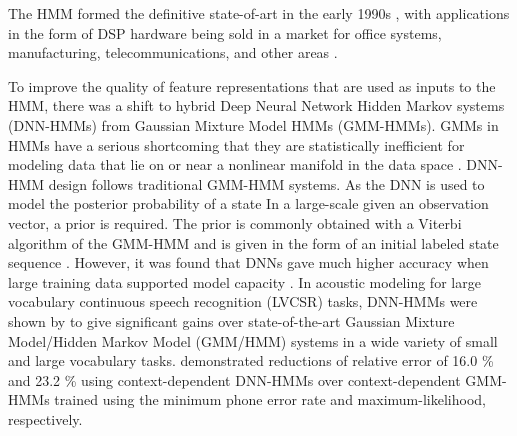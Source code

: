 \documentclass[12pt]{llncs}
\begin{document}
The HMM formed the definitive state-of-art in the early 1990s \cite{rabiner1989tutorial}, with applications in the form of DSP hardware being sold in a market for office systems, manufacturing, telecommunications, and other areas \cite[p.487]{rabiner1993fundamentals}. 



To improve the quality of feature representations that are used as inputs to the HMM, there was a shift to hybrid Deep Neural Network Hidden Markov systems (DNN-HMMs) from Gaussian Mixture Model HMMs (GMM-HMMs). GMMs in HMMs have a serious shortcoming that they are statistically inefficient for modeling data that lie on or near a nonlinear manifold in the data space \cite{hinton2012deep}.  DNN-HMM design follows traditional GMM-HMM systems. As the DNN is used to model the posterior probability of a state In a large-scale given an observation vector, a prior is required. The prior is commonly obtained with a Viterbi algorithm of the GMM-HMM and is given in the form of an initial labeled state sequence \cite{li2013hybrid}.  However, it was found that DNNs gave much higher accuracy when large training data supported model capacity \cite{deng2014achievements}.  In acoustic modeling for large vocabulary continuous speech recognition (LVCSR) tasks, DNN-HMMs were shown by \cite{dahl2012context}to give significant gains over state-of-the-art Gaussian Mixture Model/Hidden Markov Model (GMM/HMM) systems in a wide variety of small and large vocabulary tasks. \cite{dahl2012context}demonstrated reductions of relative error of 16.0 \% and 23.2 \% using context-dependent DNN-HMMs over context-dependent GMM-HMMs trained using the minimum phone error rate and maximum-likelihood, respectively.
\end{document}
